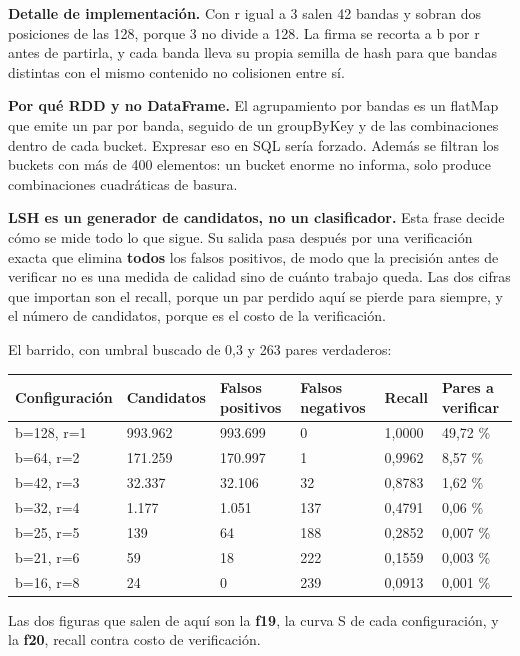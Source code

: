 \documentclass[11pt]{article}
\begin{document}
\textbf{Detalle de implementación.} Con r igual a 3 salen 42 bandas y sobran dos posiciones de las 128, porque 3 no divide a 128. La firma se recorta a b por r antes de partirla, y cada banda lleva su propia semilla de hash para que bandas distintas con el mismo contenido no colisionen entre sí.

\textbf{Por qué RDD y no DataFrame.} El agrupamiento por bandas es un flatMap que emite un par por banda, seguido de un groupByKey y de las combinaciones dentro de cada bucket. Expresar eso en SQL sería forzado. Además se filtran los buckets con más de 400 elementos: un bucket enorme no informa, solo produce combinaciones cuadráticas de basura.

\textbf{LSH es un generador de candidatos, no un clasificador.} Esta frase decide cómo se mide todo lo que sigue. Su salida pasa después por una verificación exacta que elimina \textbf{todos} los falsos positivos, de modo que la precisión antes de verificar no es una medida de calidad sino de cuánto trabajo queda. Las dos cifras que importan son el recall, porque un par perdido aquí se pierde para siempre, y el número de candidatos, porque es el costo de la verificación.

El barrido, con umbral buscado de 0,3 y 263 pares verdaderos:

\begin{center}\scriptsize
\begin{tabularx}{\linewidth}{Q{1.018}Q{1.018}Q{1.045}Q{1.045}Q{0.764}Q{1.110}}
\toprule
\textbf{Configuración} & \textbf{Candidatos} & \textbf{Falsos positivos} & \textbf{Falsos negativos} & \textbf{Recall} & \textbf{Pares a verificar} \\
\midrule
b=\allowbreak{}128, r=\allowbreak{}1 & 993.962 & 993.699 & 0 & 1,0000 & 49,72 \% \\
b=\allowbreak{}64, r=\allowbreak{}2 & 171.259 & 170.997 & 1 & 0,9962 & 8,57 \% \\
b=\allowbreak{}42, r=\allowbreak{}3 & 32.337 & 32.106 & 32 & 0,8783 & 1,62 \% \\
b=\allowbreak{}32, r=\allowbreak{}4 & 1.177 & 1.051 & 137 & 0,4791 & 0,06 \% \\
b=\allowbreak{}25, r=\allowbreak{}5 & 139 & 64 & 188 & 0,2852 & 0,007 \% \\
b=\allowbreak{}21, r=\allowbreak{}6 & 59 & 18 & 222 & 0,1559 & 0,003 \% \\
b=\allowbreak{}16, r=\allowbreak{}8 & 24 & 0 & 239 & 0,0913 & 0,001 \% \\
\bottomrule
\end{tabularx}
\end{center}
Las dos figuras que salen de aquí son la \textbf{f19}, la curva S de cada configuración, y la \textbf{f20}, recall contra costo de verificación.
\end{document}
